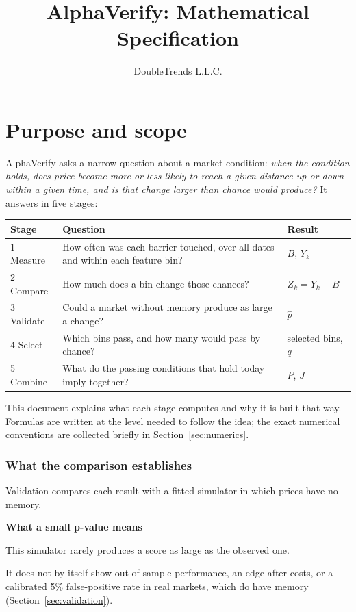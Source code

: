 \documentclass[11pt]{article}
\title{AlphaVerify: Mathematical Specification}
\author{DoubleTrends L.L.C.}
\renewcommand{\arraystretch}{1.15}
\newcommand{\topic}[1]{\Needspace{6\baselineskip}\subsubsection*{#1}}
\newenvironment{keyconcept}[1]{%
  \par\addvspace{8pt}\begin{lrbox}{\conceptbox}%
  \begin{minipage}{\dimexpr\linewidth-24pt\relax}%
  \setlength{\parindent}{0pt}%
  {\normalsize\bfseries\color{ConceptInk}#1\par}\large
}{%
  \end{minipage}\end{lrbox}%
  \noindent{\setlength{\fboxsep}{12pt}%
  \colorbox{ConceptPaper}{\usebox{\conceptbox}}}\par\addvspace{8pt}}
\begin{document}
\maketitle
\tableofcontents
\clearpage

\section{Purpose and scope}

AlphaVerify asks a narrow question about a market condition: \emph{when the
condition holds, does price become more or less likely to reach a given
distance up or down within a given time, and is that change larger than
chance would produce?} It answers in five stages:
\begin{center}
\renewcommand{\arraystretch}{1.35}
\begin{tabularx}{\linewidth}{@{}l >{\raggedright\arraybackslash}X l@{}}
\toprule
\rowcolor{ConceptPaper}
\textbf{Stage} & \textbf{Question} & \textbf{Result} \\
\midrule
1 Measure & How often was each barrier touched, over all dates and within each feature bin? & $B$, $Y_k$ \\
2 Compare & How much does a bin change those chances? & $Z_k=Y_k-B$ \\
3 Validate & Could a market without memory produce as large a change? & $\widehat p$ \\
4 Select & Which bins pass, and how many would pass by chance? & selected bins, $q$ \\
5 Combine & What do the passing conditions that hold today imply together? & $P$, $J$ \\
\bottomrule
\end{tabularx}
\end{center}
This document explains what each stage computes and why it is built that
way. Formulas are written at the level needed to follow the idea; the exact
numerical conventions are collected briefly in Section~\ref{sec:numerics}.

\topic{What the comparison establishes}

Validation compares each result with a fitted simulator in which prices have
no memory.
\begin{keyconcept}{What a small p-value means}
This simulator rarely produces a score as large as the observed one.
\end{keyconcept}
It does not by itself show out-of-sample performance, an edge after costs,
or a calibrated 5\% false-positive rate in real markets, which do have
memory (Section~\ref{sec:validation}).
\end{document}
